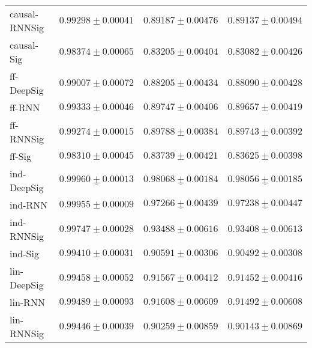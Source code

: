 \begin{tabular}{llll}
causal-RNNSig  &                           $ 0.99298 \pm 0.00041 $ &                           $ 0.89187 \pm 0.00476 $ &                           $ 0.89137 \pm 0.00494 $ \\
causal-Sig     &                           $ 0.98374 \pm 0.00065 $ &                           $ 0.83205 \pm 0.00404 $ &                           $ 0.83082 \pm 0.00426 $ \\
ff-DeepSig     &                           $ 0.99007 \pm 0.00072 $ &                           $ 0.88205 \pm 0.00434 $ &                           $ 0.88090 \pm 0.00428 $ \\
ff-RNN         &                           $ 0.99333 \pm 0.00046 $ &                           $ 0.89747 \pm 0.00406 $ &                           $ 0.89657 \pm 0.00419 $ \\
ff-RNNSig      &                           $ 0.99274 \pm 0.00015 $ &                           $ 0.89788 \pm 0.00384 $ &                           $ 0.89743 \pm 0.00392 $ \\
ff-Sig         &                           $ 0.98310 \pm 0.00045 $ &                           $ 0.83739 \pm 0.00421 $ &                           $ 0.83625 \pm 0.00398 $ \\
ind-DeepSig    &  $  \mathbf{ \underline{ 0.99960 \pm 0.00013 }} $ &  $  \mathbf{ \underline{ 0.98068 \pm 0.00184 }} $ &  $  \mathbf{ \underline{ 0.98056 \pm 0.00185 }} $ \\
ind-RNN        &               $  \mathbf{ 0.99955 \pm 0.00009 } $ &            $  \underline{ 0.97266 \pm 0.00439 } $ &            $  \underline{ 0.97238 \pm 0.00447 } $ \\
ind-RNNSig     &                           $ 0.99747 \pm 0.00028 $ &                           $ 0.93488 \pm 0.00616 $ &                           $ 0.93408 \pm 0.00613 $ \\
ind-Sig        &                           $ 0.99410 \pm 0.00031 $ &                           $ 0.90591 \pm 0.00306 $ &                           $ 0.90492 \pm 0.00308 $ \\
lin-DeepSig    &                           $ 0.99458 \pm 0.00052 $ &                           $ 0.91567 \pm 0.00412 $ &                           $ 0.91452 \pm 0.00416 $ \\
lin-RNN        &                           $ 0.99489 \pm 0.00093 $ &                           $ 0.91608 \pm 0.00609 $ &                           $ 0.91492 \pm 0.00608 $ \\
lin-RNNSig     &                           $ 0.99446 \pm 0.00039 $ &                           $ 0.90259 \pm 0.00859 $ &                           $ 0.90143 \pm 0.00869 $ \\

\end{tabular}
